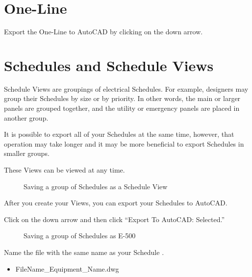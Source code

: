 \documentclass[letterpaper,10pt,english]{sphinxmanual}
\begin{document}
\newpage


\section{One-Line}
\label{\detokenize{index:one-line}}
Export the One-Line to AutoCAD by clicking on the down arrow.

\begin{figure}[H]
\centering

\noindent{}
\end{figure}

\newpage


\section{Schedules and Schedule Views}
\label{\detokenize{index:schedules-and-schedule-views}}\label{\detokenize{index:schedule-views}}
Schedule Views are groupings of electrical Schedules.  For example, designers may group their Schedules by size or by priority.  In other words, the main or larger panels are grouped together, and the utility or emergency panels are placed in another group.

It is possible to export all of your Schedules at the same time, however, that operation may take longer and it may be more beneficial to export Schedules in smaller groups.

These Views can be viewed at any time.

\begin{figure}[H]
\centering
\capstart

\noindent{}
\caption{Saving a group of Schedules as a Schedule View}\label{\detokenize{index:id5}}\end{figure}

\newpage

After you create your Views, you can export your Schedules to AutoCAD.

Click on the down arrow and then click “Export To AutoCAD: Selected.”

\begin{figure}[H]
\centering
\capstart

\noindent{}
\caption{Saving a group of Schedules as E-500}\label{\detokenize{index:id6}}\end{figure}

Name the file with the same name as your Schedule .
\begin{itemize}
\item {} 
FileName\_Equipment\_Name.dwg

\end{itemize}
\end{document}

